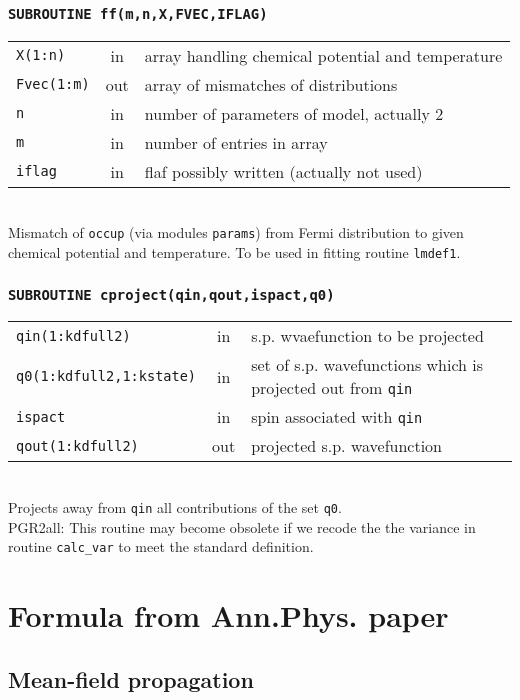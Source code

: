 \documentclass[final,1p]{elsarticle}
\newcommand{\PGRcomm}[1]{{\color{blue}\small PGR2all: #1}}
\begin{document}
\subsubsection*{\tt SUBROUTINE ff(m,n,X,FVEC,IFLAG)}
\begin{tabular}{lcl}
 {\tt X(1:n)} & in & array handling chemical potential and temperature\\
 {\tt Fvec(1:m)} & out & array of mismatches of distributions\\
 {\tt n} & in & number of parameters of model, actually 2\\
 {\tt m} & in & number of entries in array\\
 {\tt iflag} & in & flaf possibly written (actually not used)\\
\end{tabular}
\\[4pt]
Mismatch of {\tt occup} (via modules {\tt params}) from Fermi
distribution to given chemical potential and temperature. To be used
in fitting routine {\tt lmdef1}.


\subsubsection*{\tt SUBROUTINE cproject(qin,qout,ispact,q0)}
\begin{tabular}{lcl}
 {\tt qin(1:kdfull2)} & in & s.p. wvaefunction to be projected\\
 {\tt q0(1:kdfull2,1:kstate)} & in & set of s.p. wavefunctions which
 is projected out from {\tt qin}\\
 {\tt ispact} & in & spin associated with {\tt qin}\\
 {\tt qout(1:kdfull2)} & out & projected s.p. wavefunction \\
\end{tabular}
\\[4pt] Projects away from {\tt qin} all contributions of the set 
{\tt q0}.  
\\ 
\PGRcomm{This routine may become obsolete if we recode the
  the variance in routine {\tt calc\_var} to meet the
  standard definition.}


\newpage


\section{Formula from Ann.Phys. paper}

\subsection{Mean-field propagation}
\label{sec:mf}
\end{document}
